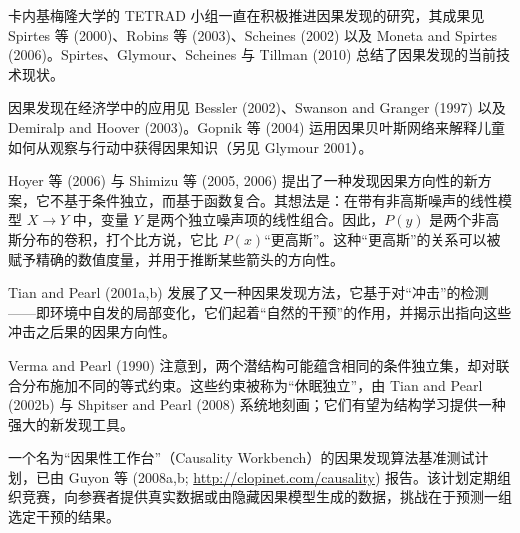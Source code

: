 卡内基梅隆大学的 TETRAD 小组一直在积极推进因果发现的研究，其成果见 Spirtes 等 (2000)、Robins 等 (2003)、Scheines (2002) 以及 Moneta and Spirtes (2006)。Spirtes、Glymour、Scheines 与 Tillman (2010) 总结了因果发现的当前技术现状。

因果发现在经济学中的应用见 Bessler (2002)、Swanson and Granger (1997) 以及 Demiralp and Hoover (2003)。Gopnik 等 (2004) 运用因果贝叶斯网络来解释儿童如何从观察与行动中获得因果知识（另见 Glymour 2001）。

Hoyer 等 (2006) 与 Shimizu 等 (2005, 2006) 提出了一种发现因果方向性的新方案，它不基于条件独立，而基于函数复合。其想法是：在带有非高斯噪声的线性模型 $X\to Y$ 中，变量 $Y$ 是两个独立噪声项的线性组合。因此，$P(y)$ 是两个非高斯分布的卷积，打个比方说，它比 $P(x)$“更高斯”。这种“更高斯”的关系可以被赋予精确的数值度量，并用于推断某些箭头的方向性。

Tian and Pearl (2001a,b) 发展了又一种因果发现方法，它基于对“冲击”的检测——即环境中自发的局部变化，它们起着“自然的干预”的作用，并揭示出指向这些冲击之后果的因果方向性。

Verma and Pearl (1990) 注意到，两个潜结构可能蕴含相同的条件独立集，却对联合分布施加不同的等式约束。这些约束被称为“休眠独立”，由 Tian and Pearl (2002b) 与 Shpitser and Pearl (2008) 系统地刻画；它们有望为结构学习提供一种强大的新发现工具。

一个名为“因果性工作台”（Causality Workbench）的因果发现算法基准测试计划，已由 Guyon 等 (2008a,b; \url{http://clopinet.com/causality}) 报告。该计划定期组织竞赛，向参赛者提供真实数据或由隐藏因果模型生成的数据，挑战在于预测一组选定干预的结果。
